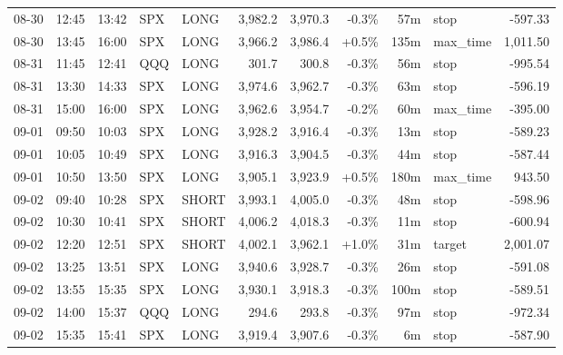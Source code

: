 \documentclass[11pt,a4paper,twoside]{article}
\begin{document}
\begin{center}
\begin{longtable}{>{\color{txtmain}}l l l l l r r r r >{\color{txtmain}}l r}
08-30 & 12:45 & 13:42 & SPX & LONG & 3,982.2 & 3,970.3 & \textcolor{lossred}{-0.3\%} & 57m & stop & \textcolor{lossred}{-597.33} \\
08-30 & 13:45 & 16:00 & SPX & LONG & 3,966.2 & 3,986.4 & \textcolor{wingreen}{+0.5\%} & 135m & max\_time & \textcolor{wingreen}{1,011.50} \\
08-31 & 11:45 & 12:41 & QQQ & LONG & 301.7 & 300.8 & \textcolor{lossred}{-0.3\%} & 56m & stop & \textcolor{lossred}{-995.54} \\
08-31 & 13:30 & 14:33 & SPX & LONG & 3,974.6 & 3,962.7 & \textcolor{lossred}{-0.3\%} & 63m & stop & \textcolor{lossred}{-596.19} \\
08-31 & 15:00 & 16:00 & SPX & LONG & 3,962.6 & 3,954.7 & \textcolor{lossred}{-0.2\%} & 60m & max\_time & \textcolor{lossred}{-395.00} \\
09-01 & 09:50 & 10:03 & SPX & LONG & 3,928.2 & 3,916.4 & \textcolor{lossred}{-0.3\%} & 13m & stop & \textcolor{lossred}{-589.23} \\
09-01 & 10:05 & 10:49 & SPX & LONG & 3,916.3 & 3,904.5 & \textcolor{lossred}{-0.3\%} & 44m & stop & \textcolor{lossred}{-587.44} \\
09-01 & 10:50 & 13:50 & SPX & LONG & 3,905.1 & 3,923.9 & \textcolor{wingreen}{+0.5\%} & 180m & max\_time & \textcolor{wingreen}{943.50} \\
09-02 & 09:40 & 10:28 & SPX & SHORT & 3,993.1 & 4,005.0 & \textcolor{lossred}{-0.3\%} & 48m & stop & \textcolor{lossred}{-598.96} \\
09-02 & 10:30 & 10:41 & SPX & SHORT & 4,006.2 & 4,018.3 & \textcolor{lossred}{-0.3\%} & 11m & stop & \textcolor{lossred}{-600.94} \\
09-02 & 12:20 & 12:51 & SPX & SHORT & 4,002.1 & 3,962.1 & \textcolor{wingreen}{+1.0\%} & 31m & target & \textcolor{wingreen}{2,001.07} \\
09-02 & 13:25 & 13:51 & SPX & LONG & 3,940.6 & 3,928.7 & \textcolor{lossred}{-0.3\%} & 26m & stop & \textcolor{lossred}{-591.08} \\
09-02 & 13:55 & 15:35 & SPX & LONG & 3,930.1 & 3,918.3 & \textcolor{lossred}{-0.3\%} & 100m & stop & \textcolor{lossred}{-589.51} \\
09-02 & 14:00 & 15:37 & QQQ & LONG & 294.6 & 293.8 & \textcolor{lossred}{-0.3\%} & 97m & stop & \textcolor{lossred}{-972.34} \\
09-02 & 15:35 & 15:41 & SPX & LONG & 3,919.4 & 3,907.6 & \textcolor{lossred}{-0.3\%} & 6m & stop & \textcolor{lossred}{-587.90} \\

\end{longtable}
\end{center}
\end{document}
